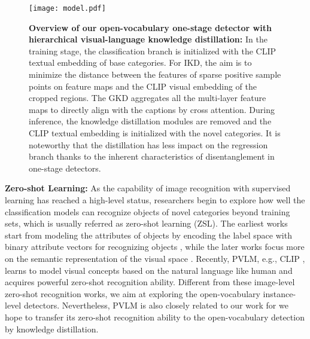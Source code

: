 \documentclass[10pt,twocolumn,letterpaper]{article}
\begin{document}
\begin{figure*}[t]
\centering
\texttt{[image: model.pdf]}
\caption{\textbf{Overview of our open-vocabulary one-stage detector with hierarchical visual-language knowledge distillation:} In the training stage, the classification branch is initialized with the CLIP textual embedding of base categories. For IKD, the aim is to minimize the distance between the features of sparse positive sample points on feature maps and the CLIP visual embedding of the cropped regions. The GKD aggregates all the multi-layer feature maps to directly align with the captions by cross attention. During inference, the knowledge distillation modules are removed and the CLIP textual embedding is initialized with the novel categories. It is noteworthy that the distillation has less impact on the regression branch thanks to the inherent characteristics of disentanglement in one-stage detectors.}
\label{fig:model}
\vspace{-1.2em}
\end{figure*}

\noindent \textbf{Zero-shot Learning:}  As the capability of image recognition with supervised learning has reached a high-level status, researchers begin to explore how well the classification models can recognize objects of novel categories beyond training sets, which is usually referred as zero-shot learning (ZSL). The earliest works start from modeling the attributes of objects by encoding the label space with binary attribute vectors for recognizing objects \cite{farhadi2009describing, palatucci2009zero, jayaraman2014zero}, while the later works focus more on the semantic representation of the visual space \cite{frome2013devise, norouzi2013zero, wang2018zero}. Recently, PVLM, e.g., CLIP \cite{radford2021learning}, learns to model visual concepts based on the natural language like human and acquires powerful zero-shot recognition ability. Different from these image-level zero-shot recognition works, we aim at exploring the open-vocabulary instance-level detectors. Nevertheless, PVLM is also closely related to our work for we hope to transfer its zero-shot recognition ability to the open-vocabulary detection by knowledge distillation.     
\end{document}
